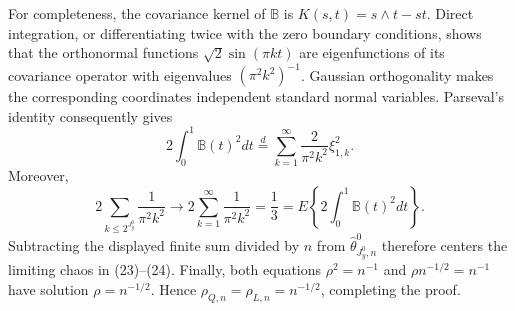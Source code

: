 For completeness, the covariance kernel of \(\mathbb B\) is \(K(s,t)=s\wedge t-st\).  Direct integration, or differentiating twice with the zero boundary conditions, shows that the orthonormal functions \(\sqrt2\sin(\pi kt)\) are eigenfunctions of its covariance operator with eigenvalues \((\pi^2k^2)^{-1}\).  Gaussian orthogonality makes the corresponding coordinates independent standard normal variables.  Parseval's identity consequently gives
\[
 2\int_0^1\mathbb B(t)^2dt
 \stackrel{d}{=}\sum_{k=1}^\infty\frac{2}{\pi^2k^2}\xi_{1,k}^2. \tag{24}
\]
Moreover,
\[
 2\sum_{k\le2^{J_y^0}}\frac1{\pi^2k^2}\longrightarrow
 2\sum_{k=1}^\infty\frac1{\pi^2k^2}=\frac13
 =E\left\{2\int_0^1\mathbb B(t)^2dt\right\}.
\]
Subtracting the displayed finite sum divided by \(n\) from \(\widehat\theta^0_{J_y^0,n}\) therefore centers the limiting chaos in (23)--(24).  Finally, both equations \(\rho^2=n^{-1}\) and \(\rho n^{-1/2}=n^{-1}\) have solution \(\rho=n^{-1/2}\).  Hence \(\rho_{Q,n}=\rho_{L,n}=n^{-1/2}\), completing the proof.
